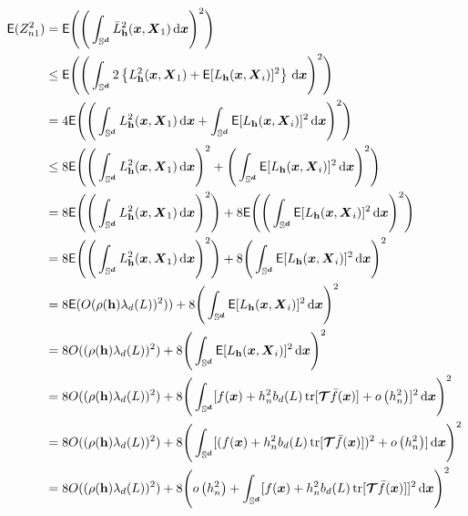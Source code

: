 \documentclass{article}
\begin{document}
\begin{align*}
    \mathsf{E} (Z_{n1}^2) =&\; \mathsf{E} \Bigg( \Bigg(\int_{\Sr}  \bar{L}_{\bh}^2 (\bx,\bX_1)  \,\rd \bx \Bigg)^2 \Bigg) \\
    \leq &\; \mathsf{E} \Bigg( \Bigg(\int_{\Sr} 2\lrb{L^2_{\bh} (\bx,\bX_1) + \mathsf{E} [L_{\bh} (\bx,\bX_i)]^2 } \,\rd \bx \Bigg)^2 \Bigg) \\
    = &\; 4\mathsf{E} \Bigg( \Bigg(\int_{\Sr} L^2_{\bh} (\bx,\bX_1)\,\rd \bx  + \int_{\Sr}\mathsf{E} [L_{\bh} (\bx,\bX_i)]^2  \,\rd \bx \Bigg)^2 \Bigg) \\
    \leq &\; 8\mathsf{E} \Bigg( \Bigg(\int_{\Sr} L^2_{\bh} (\bx,\bX_1)\,\rd \bx\Bigg)^2  + \Bigg(\int_{\Sr}\mathsf{E} [L_{\bh} (\bx,\bX_i)]^2  \,\rd \bx \Bigg)^2 \Bigg) \\
    = &\; 8\mathsf{E} \Bigg( \Bigg(\int_{\Sr} L^2_{\bh} (\bx,\bX_1)\,\rd \bx\Bigg)^2 \Bigg)  + 8\mathsf{E} \Bigg( \Bigg(\int_{\Sr}\mathsf{E} [L_{\bh} (\bx,\bX_i)]^2  \,\rd \bx \Bigg)^2 \Bigg) \\
    = &\; 8\mathsf{E} \Bigg( \Bigg(\int_{\Sr} L^2_{\bh} (\bx,\bX_1)\,\rd \bx\Bigg)^2 \Bigg)  + 8 \Bigg(\int_{\Sr}\mathsf{E} [L_{\bh} (\bx,\bX_i)]^2  \,\rd \bx \Bigg)^2 \\
    = &\; 8\mathsf{E} ( O ( \rho ( \bh ) \lambda_d(L) )^2 ))  + 8 \Bigg(\int_{\Sr}\mathsf{E} [L_{\bh} (\bx,\bX_i)]^2  \,\rd \bx \Bigg)^2 \\
    = &\; 8 O (( \rho ( \bh ) \lambda_d(L) )^2 )  + 8 \Bigg(\int_{\Sr}\mathsf{E} [L_{\bh} (\bx,\bX_i)]^2  \,\rd \bx \Bigg)^2 \\
    = &\; 8 O (( \rho ( \bh ) \lambda_d(L) )^2 )  + 8 \Bigg(\int_{\Sr} [f(\boldsymbol{x})+h_n^2 b_d(L) \operatorname{tr}[\boldsymbol{\mathcal { T }} \bar{f}(\boldsymbol{x})]+o\left(h_n^2\right)]^2 \,\rd \bx \Bigg)^2 \\
    = &\; 8 O (( \rho ( \bh ) \lambda_d(L) )^2 )  + 8 \Bigg(\int_{\Sr} [(f(\boldsymbol{x})+h_n^2 b_d(L) \operatorname{tr}[\boldsymbol{\mathcal { T }} \bar{f}(\boldsymbol{x})])^2 +o\left(h_n^2\right)] \,\rd \bx \Bigg)^2 \\
    = &\; 8 O (( \rho ( \bh ) \lambda_d(L) )^2 )  + 8 \Bigg( o\left(h_n^2\right) + \int_{\Sr} [f(\boldsymbol{x})+h_n^2 b_d(L) \operatorname{tr}[\boldsymbol{\mathcal { T }} \bar{f}(\boldsymbol{x})]]^2 \,\rd \bx \Bigg)^2 \\

\end{align*}
\end{document}
